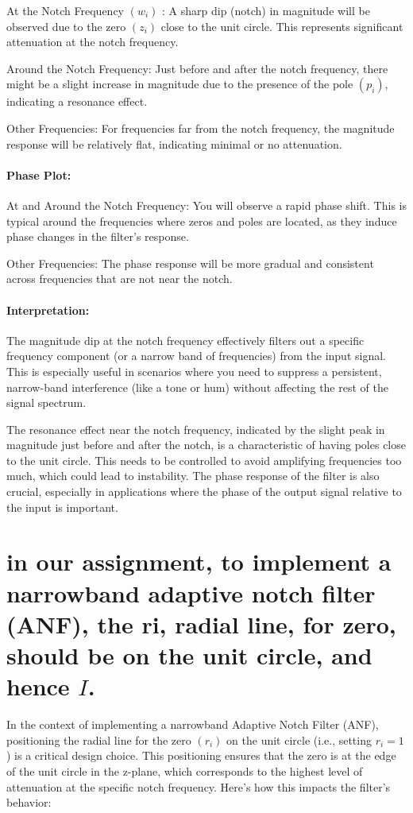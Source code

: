 At the Notch Frequency $\left(w_{i}\right)$ : A sharp dip (notch) in magnitude will be observed due to the zero $\left(z_{i}\right)$ close to the unit circle. This represents significant attenuation at the notch frequency.

Around the Notch Frequency: Just before and after the notch frequency, there might be a slight increase in magnitude due to the presence of the pole $\left(p_{i}\right)$, indicating a resonance effect.

Other Frequencies: For frequencies far from the notch frequency, the magnitude response will be relatively flat, indicating minimal or no attenuation.

\paragraph{Phase Plot:}

At and Around the Notch Frequency: You will observe a rapid phase shift. This is typical around the frequencies where zeros and poles are located, as they induce phase changes in the filter's response.

Other Frequencies: The phase response will be more gradual and consistent across frequencies that are not near the notch.

\paragraph{Interpretation:}

The magnitude dip at the notch frequency effectively filters out a specific frequency component (or a narrow band of frequencies) from the input signal. This is especially useful in scenarios where you need to suppress a persistent, narrow-band interference (like a tone or hum) without affecting the rest of the signal spectrum.

The resonance effect near the notch frequency, indicated by the slight peak in magnitude just before and after the notch, is a characteristic of having poles close to the unit circle. This needs to be controlled to avoid amplifying frequencies too much, which could lead to instability. The phase response of the filter is also crucial, especially in applications where the phase of the output signal relative to the input is important.

\section{in our assignment, to implement a narrowband adaptive notch filter (ANF), the ri, radial line, for zero, should be on the unit circle, and hence $I$.}
In the context of implementing a narrowband Adaptive Notch Filter (ANF), positioning the radial line for the zero $\left(r_{i}\right)$ on the unit circle (i.e., setting $r_{i}=1$ ) is a critical design choice. This positioning ensures that the zero is at the edge of the unit circle in the z-plane, which corresponds to the highest level of attenuation at the specific notch frequency. Here's how this impacts the filter's behavior:

